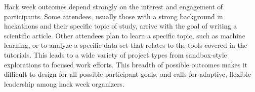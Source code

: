 Hack week outcomes depend strongly on the interest and engagement of participants.
Some attendees, usually those with a strong background in hackathons and their specific topic of study, arrive with the goal of writing a scientific article.
Other attendees plan to learn a specific topic, such as machine learning, or to analyze a specific data set that relates to the tools covered in the tutorials.
This leads to a wide variety of project types from sandbox-style explorations to focused work efforts.
This breadth of possible outcomes makes it difficult to design for all possible participant goals, and calls for adaptive, flexible leadership among hack week organizers.